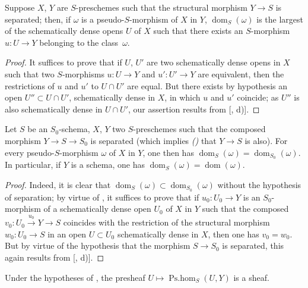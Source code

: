 \begin{proposition}[20.2.4]
\label{IV.20.2.4}
Suppose $X$, $Y$ are $S$-preschemes such that the structural morphism $Y\to S$ is separated;
then, if $\omega$ is a pseudo-$S$-morphism of $X$ in $Y$, $\operatorname{dom}_S(\omega)$ is the largest of the schematically dense opens $U$ of $X$ such that there exists an $S$-morphism $u:U\to Y$ belonging to the class~$\omega$.
\end{proposition}

\begin{proof}
It suffices to prove that if $U$, $U'$ are two schematically dense opens in $X$ such that two $S$-morphisms $u:U\to Y$ and $u':U'\to Y$ are equivalent, then the restrictions of $u$ and $u'$ to $U\cap U'$ are equal.
But there exists by hypothesis an open $U''\subset U\cap U'$, schematically dense in $X$, in which $u$ and $u'$ coincide;
as $U''$ is also schematically dense in $U\cap U'$, our assertion results from [, d)].
\end{proof}

\begin{corollary}[20.2.5]
\label{IV.20.2.5}
Let $S$ be an $S_0$-schema, $X$, $Y$ two $S$-preschemes such that the composed morphism $Y\to S\to S_0$ is separated (which implies \emph{()} that $Y\to S$ is also).
For every pseudo-$S$-morphism $\omega$ of $X$ in $Y$, one then has $\operatorname{dom}_S(\omega)=\operatorname{dom}_{S_0}(\omega)$.
In particular, if $Y$ is a schema, one has $\operatorname{dom}_S(\omega)=\operatorname{dom}(\omega)$.
\end{corollary}

\begin{proof}
Indeed, it is clear that $\operatorname{dom}_S(\omega)\subset\operatorname{dom}_{S_0}(\omega)$ without the hypothesis of separation;
by virtue of , it suffices to prove that if $u_0:U_0\to Y$ is an $S_0$-morphism of a
schematically dense open $U_0$ of $X$ in $Y$ such that the composed $v_0:U_0\xrightarrow{u_0}Y\to S$ coincides with the restriction of the structural morphism $w_0:U_0\to S$ in an open $U\subset U_0$ schematically dense in $X$, then one has $v_0=w_0$.
But by virtue of the hypothesis that the morphism $S\to S_0$ is separated, this again results from [, d)].
\end{proof}

\begin{corollary}[20.2.6]
\label{IV.20.2.6}
Under the hypotheses of , the presheaf $U\mapsto\operatorname{Ps.hom}_S(U,Y)$ is a sheaf.
\end{corollary}

